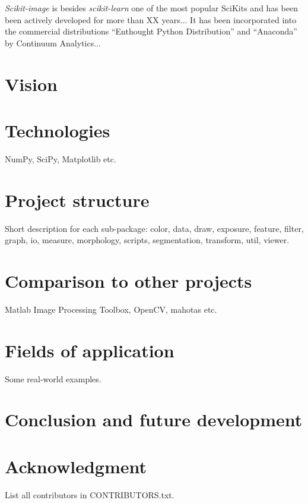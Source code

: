 \textit{Scikit-image} is besides \textit{scikit-learn} one of the most popular SciKits and has been been actively developed for more than XX years... It has been incorporated into the commercial distributions "`Enthought Python Distribution"' and "`Anaconda"' by Continuum Analytics...

\section{Vision}

\section{Technologies}

NumPy, SciPy, Matplotlib etc.

\section{Project structure}

Short description for each sub-package: color, data, draw, exposure, feature, filter, graph, io, measure, morphology, scripts, segmentation, transform, util, viewer.

\section{Comparison to other projects}

Matlab Image Processing Toolbox, OpenCV, mahotas etc.

\section{Fields of application}

Some real-world examples.

\section{Conclusion and future development}

\section{Acknowledgment}

List all contributors in CONTRIBUTORS.txt.


\nocite{*}


